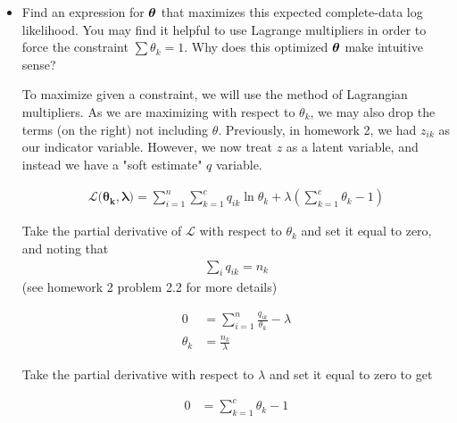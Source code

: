 \documentclass[submit]{harvardml}
\newenvironment{answer}{%
\color{answergreen}\sffamily\large}{}
\begin{document}
\begin{enumerate}
\begin{itemize}
\begin{answer}
            \end{answer}

        \item Find an expression for $\boldsymbol{\theta}$ that maximizes this expected complete-data log
            likelihood. You may find it helpful to use Lagrange multipliers in order to force
            the constraint $\sum \theta_k = 1$. Why does this optimized $\boldsymbol{\theta}$ make intuitive
            sense?

            To maximize given a constraint, we will use the method of Lagrangian multipliers. As
            we are maximizing with respect to $\theta_k$, we may also drop the terms (on the
            right) not including $\theta$. Previously, in homework 2, we had $z_{ik}$ as our
            indicator variable. However, we now treat $z$ as a latent variable, and instead we
            have a "soft estimate" $q$ variable.

            \begin{answer}

                \begin{align}
                    \mathcal{L(\mathbf{\theta_k, \lambda}}) = \sum_{i=1}^n \sum_{k=1}^c q_{ik}
                    \ln\theta_k + \lambda (\sum_{k=1}^c \theta_k - 1) \label{eq:lag}
                \end{align}

                Take the partial derivative of $\mathcal{L}$ with respect to $\theta_k$ and set
                it equal to zero, and noting that 
                \begin{align}
                    \sum_i q_{ik} = n_k \label{eq:sumq}
                \end{align}
                (see homework 2 problem 2.2 for more details)

                \begin{align}
                    0 &= \sum_{i=1}^n \frac{q_{ik}}{\theta_k} - \lambda \\ \label{eq:latheta}
                    \theta_k &= \frac{n_k }{\lambda}
                \end{align}

                Take the partial derivative with respect to $\lambda$ and set it equal to zero
                to get

                \begin{align}
                    0 &= \sum_{k=1}^c \theta_k - 1\\ \label{eq:lalambda}
                \end{align}


\end{answer}
\end{itemize}
\end{enumerate}
\end{document}
